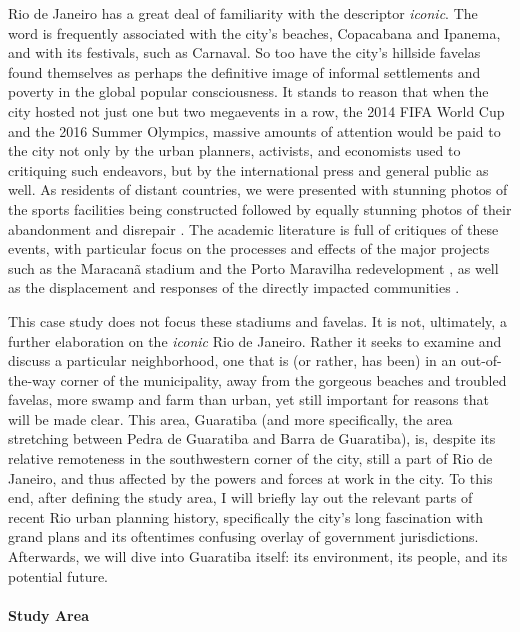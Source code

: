 Rio de Janeiro has a great deal of familiarity with the descriptor \textit{iconic}. The word is frequently associated with the city's beaches, Copacabana and Ipanema, and with its festivals, such as Carnaval. So too have the city's hillside favelas found themselves as perhaps the definitive image of informal settlements and poverty in the global popular consciousness. It stands to reason that when the city hosted not just one but two megaevents in a row, the 2014 FIFA World Cup and the 2016 Summer Olympics, massive amounts of attention would be paid to the city not only by the urban planners, activists, and economists used to critiquing such endeavors, but by the international press and general public as well. As residents of distant countries, we were presented with stunning photos of the sports facilities being constructed \cite{umlaufRioCityTransformed2016} followed by equally stunning photos of their abandonment and disrepair \cite{olivaresRioOlympicVenues2017}. The academic literature is full of critiques of these events, with particular focus on the processes and effects of the major projects such as the Maracanã stadium and the Porto Maravilha redevelopment \cite{sanchezMegaeventsUrbanRegeneration2013}, as well as the displacement and responses of the directly impacted communities  \cite{talbotHumanRightsAbuses2018,viehoffPoliticsMegaeventPlanning2016}. 

This case study does not focus these stadiums and favelas. It is not, ultimately, a further elaboration on the \textit{iconic} Rio de Janeiro. Rather it seeks to examine and discuss a particular neighborhood, one that is (or rather, has been) in an out-of-the-way corner of the municipality, away from the gorgeous beaches and troubled favelas, more swamp and farm than urban, yet still important for reasons that will be made clear. This area, Guaratiba (and more specifically, the area stretching between Pedra de Guaratiba and Barra de Guaratiba), is, despite its relative remoteness in the southwestern corner of the city, still a part of Rio de Janeiro, and thus affected by the powers and forces at work in the city. To this end, after defining the study area, I will briefly lay out the relevant parts of recent Rio urban planning history, specifically the city's long fascination with grand plans and its oftentimes confusing overlay of government jurisdictions. Afterwards, we will dive into Guaratiba itself: its environment, its people, and its potential future. 

\paragraph{Study Area} \leavevmode\newline

